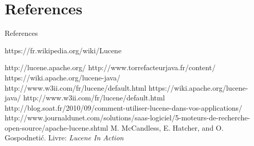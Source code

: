 \documentclass[10pt]{beamer}
\begin{document}
\section{References}
\begin{frame}{References}


%

\begin{thebibliography}{1}

https://fr.wikipedia.org/wiki/Lucene

http://lucene.apache.org/
http://www.torrefacteurjava.fr/content/
https://wiki.apache.org/lucene-java/
http://www.w3ii.com/fr/lucene/default.html
https://wiki.apache.org/lucene-java/
http://www.w3ii.com/fr/lucene/default.html
http://blog.soat.fr/2010/09/comment-utiliser-lucene-dans-vos-applications/
http://www.journaldunet.com/solutions/saas-logiciel/5-moteurs-de-recherche-open-source/apache-lucene.shtml
M. McCandless, E. Hatcher, and O. Gospodnetić.
\newblock Livre:  {\em Lucene In Action}
\end{thebibliography}
\end{frame}


{\1
\begin{frame}
\end{frame}}
\end{document}
